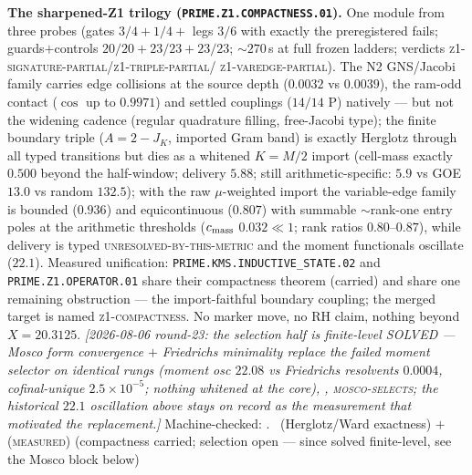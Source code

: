 \documentclass[11pt,a4paper]{article}
\theoremstyle{definition}
\begin{document}
\par\smallskip\noindent\textbf{The sharpened-Z1 trilogy
(\texttt{PRIME.Z1.COMPACTNESS.01}).}
One module from three probes (gates $3/4+1/4+$ legs $3/6$ with
exactly the preregistered fails; guards$+$controls
$20/20+23/23+23/23$; ${\sim}270$\,s at full frozen ladders;
verdicts \textsc{z1-signature-partial}/\textsc{z1-triple-partial}/%
\textsc{z1-varedge-partial}).  The N2 GNS/Jacobi family carries
edge collisions at the source depth ($0.0032$ vs $0.0039$), the
ram-odd contact ($\cos$ up to $0.9971$) and settled couplings
($14/14$ P) natively --- but not the widening cadence (regular
quadrature filling, free-Jacobi type); the finite boundary triple
($A=2-J_K$, imported Gram band) is exactly Herglotz through all
typed transitions but dies as a whitened $K=M/2$ import
(cell-mass exactly $0.500$ beyond the half-window; delivery
$5.88$; still arithmetic-specific: $5.9$ vs GOE $13.0$ vs random
$132.5$); with the raw $\mu$-weighted import the variable-edge
family is bounded ($0.936$) and equicontinuous ($0.807$) with
summable ${\sim}$rank-one entry poles at the arithmetic
thresholds ($c_{\rm mass}$ $0.032\ll1$; rank ratios
$0.80$--$0.87$), while delivery is typed
\textsc{unresolved-by-this-metric} and the moment functionals
oscillate ($22.1$).  Measured unification:
\texttt{PRIME.KMS.INDUCTIVE\_STATE.02} and
\texttt{PRIME.Z1.OPERATOR.01} share their compactness theorem
(carried) and share one remaining obstruction --- the
import-faithful boundary coupling; the merged target is named
\textsc{z1-compactness}.  No marker move, no RH claim, nothing
beyond $X=20.3125$.  \emph{[2026-08-06 round-23: the selection
half is finite-level SOLVED --- Mosco form convergence $+$
Friedrichs minimality replace the failed moment selector on
identical rungs (moment osc $22.08$ vs Friedrichs resolvents
$0.0004$, cofinal-unique $2.5\times10^{-5}$; nothing whitened at
the core), ,
\textsc{mosco-selects}; the historical $22.1$ oscillation above
stays on record as the measurement that motivated the
replacement.]}
Machine-checked: .
\mE\ (Herglotz/Ward exactness) $+$ (\textsc{measured})
(compactness carried; selection open --- since solved
finite-level, see the Mosco block below)
\par\smallskip
\end{document}
